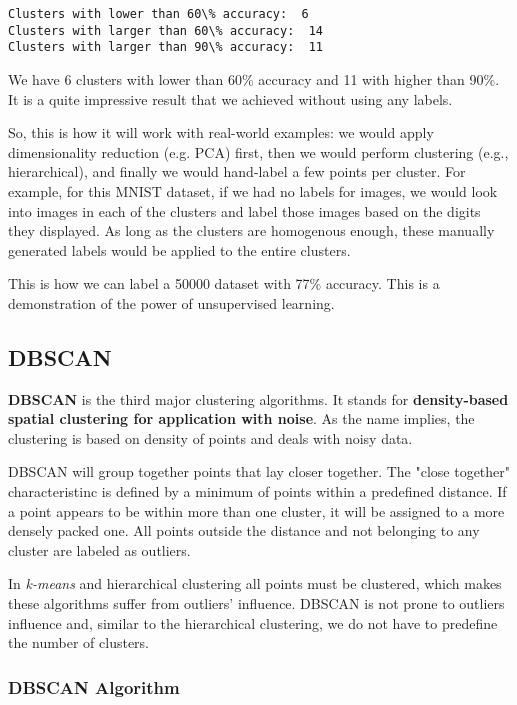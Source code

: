 \documentclass[11pt]{article}
\begin{document}
    \begin{Verbatim}[commandchars=\\\{\}]
Clusters with lower than 60\% accuracy:  6
Clusters with larger than 60\% accuracy:  14
Clusters with larger than 90\% accuracy:  11

    \end{Verbatim}

    We have 6 clusters with lower than 60\% accuracy and 11 with higher than
90\%. It is a quite impressive result that we achieved without using any
labels.

So, this is how it will work with real-world examples: we would apply
dimensionality reduction (e.g. PCA) first, then we would perform
clustering (e.g., hierarchical), and finally we would hand-label a few
points per cluster. For example, for this MNIST dataset, if we had no
labels for images, we would look into images in each of the clusters and
label those images based on the digits they displayed. As long as the
clusters are homogenous enough, these manually generated labels would be
applied to the entire clusters.

This is how we can label a 50000 dataset with 77\% accuracy. This is a
demonstration of the power of unsupervised learning.

\subsection{DBSCAN}\label{dbscan}

\textbf{DBSCAN} is the third major clustering algorithms. It stands for
\textbf{density-based spatial clustering for application with noise}. As
the name implies, the clustering is based on density of points and deals
with noisy data.

DBSCAN will group together points that lay closer together. The "close
together" characteristinc is defined by a minimum of points within a
predefined distance. If a point appears to be within more than one
cluster, it will be assigned to a more densely packed one. All points
outside the distance and not belonging to any cluster are labeled as
outliers.

In \emph{k-means} and hierarchical clustering all points must be
clustered, which makes these algorithms suffer from outliers' influence.
DBSCAN is not prone to outliers influence and, similar to the
hierarchical clustering, we do not have to predefine the number of
clusters.

\subsubsection{DBSCAN Algorithm}\label{dbscan-algorithm}
\end{document}
